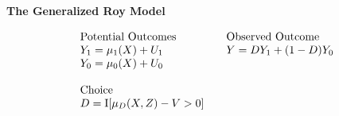 \begin{frame}
\textbf{The Generalized Roy Model}

\begin{align*}\begin{array}{l@{\qquad}l}
\text{Potential Outcomes} &\text{Observed Outcome}\\
Y_1 = \mu_1(X) + U_1      &  Y = D Y_1 + (1 - D)Y_0 \\
Y_0 = \mu_0(X) + U_0      &\\
    & \\
\text{Choice} & \\
D = \mathrm{I}[\mu_D(X, Z) - V > 0] & \\
\end{array}
\end{align*}
\end{frame}
\maketitle

